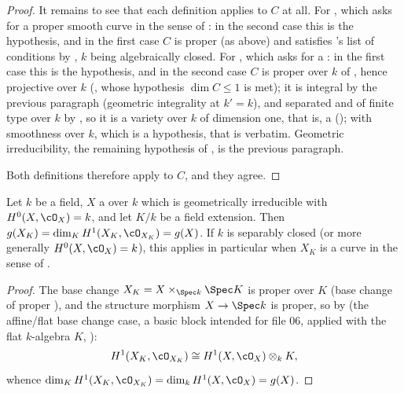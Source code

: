 \begin{proof}
It remains to see that each definition applies to $C$ at all.  For
, which asks for a proper smooth curve in the sense
of : in the second case this is the hypothesis, and
in the first case $C$ is proper (as above) and satisfies
's list of conditions by
, $k$ being algebraically closed.  For
, which asks for a
: in
the first case this is the hypothesis, and in the second case $C$ is
proper over $k$ of , hence
projective over $k$ (, whose
hypothesis $\dim C\leq1$ is met); it is integral by the previous
paragraph (geometric integrality at $k'=k$), and separated and of finite
type over $k$ by , so it is a variety over $k$ of
dimension one, that is, a 
(); with smoothness over $k$, which is a hypothesis,
that is  verbatim.  Geometric
irreducibility, the remaining hypothesis of , is the
previous paragraph.

Both definitions therefore apply to $C$, and they agree.
\end{proof}

\begin{lemma}
\label{lem:pc-genus-base-change}
Let $k$ be a field, $X$ a
 over
$k$ which is geometrically irreducible with $H^0(X,\cO_X)=k$, and let
$K/k$ be a field extension.  Then
$g(X_K)=\dim_KH^1(X_K,\cO_{X_K})=g(X)$.  If $k$ is separably closed (or
more generally $H^0(X,\cO_X)=k$), this applies in particular when
$X_K$ is a curve in the sense of .
\end{lemma}
\begin{proof}
The base change $X_K=X\times_{\Spec k}\Spec K$ is proper over $K$
(base change of proper ), and the
structure morphism $X\to\Spec k$ is proper, so by
 (the affine/flat base change
case, a basic block intended for file 06, applied with the flat $k$-algebra
$K$, ):
\[
H^1(X_K,\cO_{X_K})\cong H^1(X,\cO_X)\otimes_kK,
\]
whence $\dim_KH^1(X_K,\cO_{X_K})=\dim_kH^1(X,\cO_X)=g(X)$.
\end{proof}

